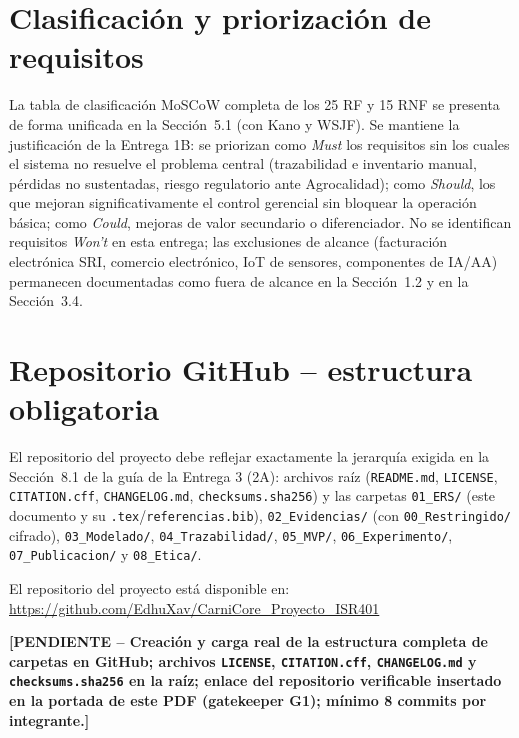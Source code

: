 \documentclass[11pt,a4paper]{article}
\newcommand{\PENDIENTE}[1]{\textcolor{pendiente}{\textbf{[PENDIENTE -- #1]}}}
\begin{document}
\section{Clasificación y priorización de requisitos}
La tabla de clasificación MoSCoW completa de los 25 RF y 15 RNF se presenta de forma unificada en la Sección~5.1 (con Kano y WSJF). Se mantiene la justificación de la Entrega 1B: se priorizan como \textit{Must} los requisitos sin los cuales el sistema no resuelve el problema central (trazabilidad e inventario manual, pérdidas no sustentadas, riesgo regulatorio ante Agrocalidad); como \textit{Should}, los que mejoran significativamente el control gerencial sin bloquear la operación básica; como \textit{Could}, mejoras de valor secundario o diferenciador. No se identifican requisitos \textit{Won't} en esta entrega; las exclusiones de alcance (facturación electrónica SRI, comercio electrónico, IoT de sensores, componentes de IA/AA) permanecen documentadas como fuera de alcance en la Sección~1.2 y en la Sección~3.4.

\section{Repositorio GitHub -- estructura obligatoria}
El repositorio del proyecto debe reflejar exactamente la jerarquía exigida en la Sección~8.1 de la guía de la Entrega 3 (2A): archivos raíz (\texttt{README.md}, \texttt{LICENSE}, \texttt{CITATION.cff}, \texttt{CHANGELOG.md}, \texttt{checksums.sha256}) y las carpetas \texttt{01\_ERS/} (este documento y su \texttt{.tex}/\texttt{referencias.bib}), \texttt{02\_Evidencias/} (con \texttt{00\_Restringido/} cifrado), \texttt{03\_Modelado/}, \texttt{04\_Trazabilidad/}, \texttt{05\_MVP/}, \texttt{06\_Experimento/}, \texttt{07\_Publicacion/} y \texttt{08\_Etica/}.

El repositorio del proyecto está disponible en: \url{https://github.com/EdhuXav/CarniCore_Proyecto_ISR401}

\PENDIENTE{Creación y carga real de la estructura completa de carpetas en GitHub; archivos \texttt{LICENSE}, \texttt{CITATION.cff}, \texttt{CHANGELOG.md} y \texttt{checksums.sha256} en la raíz; enlace del repositorio verificable insertado en la portada de este PDF (gatekeeper G1); mínimo 8 commits por integrante.}
\end{document}

